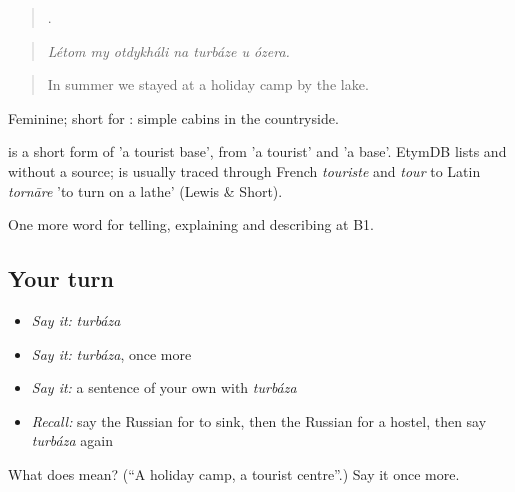 \begin{quote}
      .
\end{quote}

\begin{quote}
\emph{Létom my otdykháli na turbáze u ózera.}
\end{quote}

\begin{quote}
In summer we stayed at a holiday camp by the lake.
\end{quote}

Feminine; short for \emph{ }: simple cabins in the countryside.

\begin{cousinweb}
\emph{} is a short form of \emph{ } 'a tourist base', from \emph{} 'a tourist' and \emph{} 'a base'. EtymDB lists \emph{} and \emph{} without a source; \emph{} is usually traced through French \emph{touriste} and \emph{tour} to Latin \emph{tornāre} 'to turn on a lathe' (Lewis \& Short).
\end{cousinweb}

\begin{grammarlens}[title={What you've built}]
One more word for telling, explaining and describing at B1.
\end{grammarlens}

\subsection*{Your turn}
\begin{itemize}
\raggedright
  \item \emph{Say it:} \emph{turbáza}
  \item \emph{Say it:} \emph{turbáza}, once more
  \item \emph{Say it:} a sentence of your own with \emph{turbáza}
  \item \emph{Recall:} say the Russian for to sink, then the Russian for a hostel, then say \emph{turbáza} again
\end{itemize}

\begin{tcolorbox}[breakable,colback=teal!4,colframe=teal!35!black,title={Before you move on}]
What does  mean? (\textquotedblleft{}A holiday camp, a tourist centre\textquotedblright{}.) Say it once more.
\end{tcolorbox}
